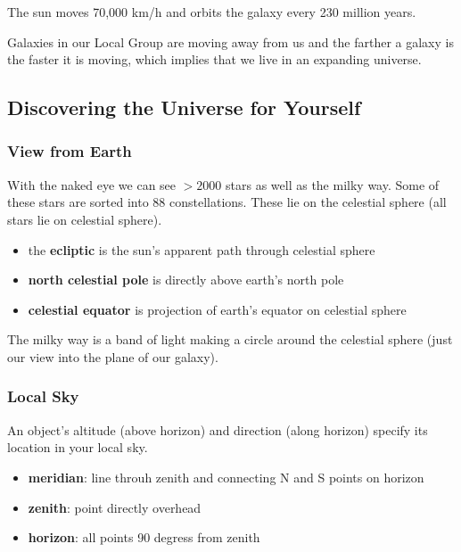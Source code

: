 \documentclass[12pt]{article}
\begin{document}
The sun moves 70,000 km/h and orbits the galaxy every 230 million years.

Galaxies in our Local Group are moving away from us and the farther a galaxy is the faster it is moving, which implies that we live in an expanding universe.


\subsection{Discovering the Universe for Yourself}
\subsubsection{View from Earth}
With the naked eye we can see $>2000$ stars as well as the milky way. Some of these stars are sorted into 88 constellations. These lie on the celestial sphere (all stars lie on celestial sphere).
\begin{itemize}
    \item the \textbf{ecliptic} is the sun's apparent path through celestial sphere
    \item \textbf{north celestial pole} is directly above earth's north pole
    \item \textbf{celestial equator} is projection of earth's equator on celestial sphere
\end{itemize}
The milky way is a band of light making a circle around the celestial sphere (just our view into the plane of our galaxy).

\subsubsection{Local Sky}
An object's altitude (above horizon) and direction (along horizon) specify its location in your local sky.
\begin{itemize}
    \item \textbf{meridian}: line throuh zenith and connecting N and S points on horizon
    \item \textbf{zenith}: point directly overhead
    \item \textbf{horizon}: all points 90 degress from zenith
\end{itemize}
\end{document}
